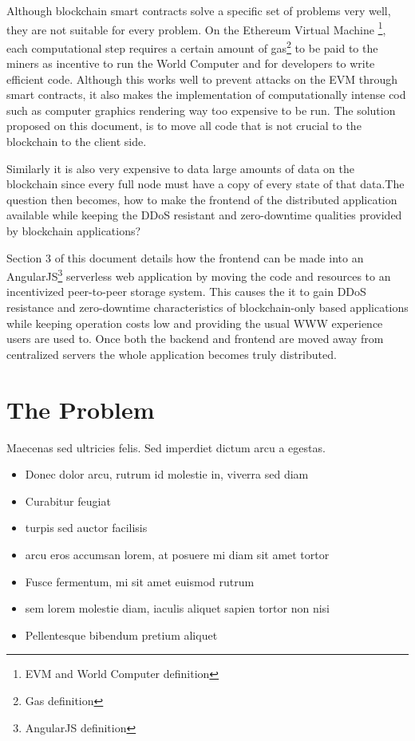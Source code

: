\documentclass[twoside]{article}
\begin{document}
Although blockchain smart contracts solve a specific set of problems very well, they are not suitable for every problem. On the Ethereum Virtual Machine \footnote{EVM and World Computer definition}, each computational step requires a certain amount of gas\footnote{Gas definition} to be paid to the miners as incentive to run the World Computer and for developers to write efficient code. Although this works well to prevent attacks on the EVM through smart contracts, it also makes the implementation of computationally intense cod such as computer graphics rendering way too expensive to be run. The solution proposed on this document, is to move all code that is not crucial to the blockchain to the client side.

Similarly it is also very expensive to data large amounts of data on the blockchain since every full node must have a copy of every state of that data.The question then becomes, how to make the frontend of the distributed application available while keeping the DDoS resistant and zero-downtime qualities provided by blockchain applications?

Section 3 of this document details how the frontend can be made into an AngularJS\footnote{AngularJS definition} serverless web application by moving the code and resources to an incentivized peer-to-peer storage system. This causes the it to gain DDoS resistance and zero-downtime characteristics of blockchain-only based applications while keeping operation costs low and providing the usual WWW experience users are used to. Once both the backend and frontend are moved away from centralized servers the whole application becomes truly distributed.



\section{The Problem}

Maecenas sed ultricies felis. Sed imperdiet dictum arcu a egestas. 
\begin{itemize}
\item Donec dolor arcu, rutrum id molestie in, viverra sed diam
\item Curabitur feugiat
\item turpis sed auctor facilisis
\item arcu eros accumsan lorem, at posuere mi diam sit amet tortor
\item Fusce fermentum, mi sit amet euismod rutrum
\item sem lorem molestie diam, iaculis aliquet sapien tortor non nisi
\item Pellentesque bibendum pretium aliquet
\end{itemize}
\blindtext %
\end{document}
